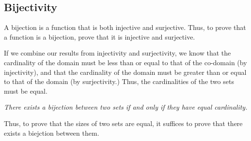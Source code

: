 \documentclass[12pt,letterpaper]{article}
\begin{document}
    \subsection{Bijectivity}
    
    A bijection is a function that is both injective and surjective. Thus, to prove that a function is a bijection, prove that it is injective and surjective.
    
    If we combine our results from injectivity and surjectivity, we know that the cardinality of the domain must be less than or equal to that of the co-domain (by injectivity), and that the cardinality of the domain must be greater than or equal to that of the domain (by surjectivity.) Thus, the cardinalities of the two sets must be equal.
    
    \begin{center}
    \textit{There exists a bijection between two sets if and only if they have equal cardinality.}
    \end{center}
    
    Thus, to prove that the sizes of two sets are equal, it suffices to prove that there exists a biejction between them.

        
    \begin{figure}[h]
     \centering
    \end{figure}
    
\end{document}
